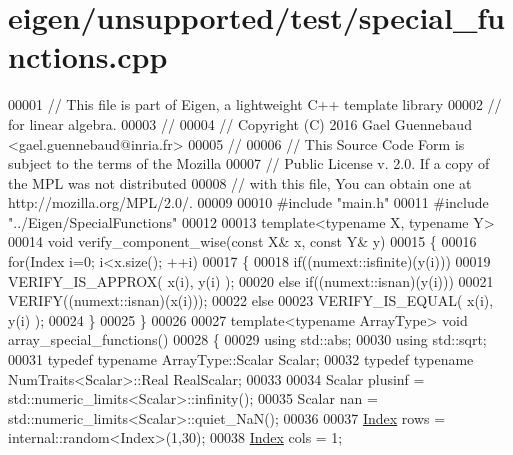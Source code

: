 \hypertarget{eigen_2unsupported_2test_2special__functions_8cpp_source}{}\section{eigen/unsupported/test/special\+\_\+functions.cpp}
\label{eigen_2unsupported_2test_2special__functions_8cpp_source}

\begin{DoxyCode}
00001 \textcolor{comment}{// This file is part of Eigen, a lightweight C++ template library}
00002 \textcolor{comment}{// for linear algebra.}
00003 \textcolor{comment}{//}
00004 \textcolor{comment}{// Copyright (C) 2016 Gael Guennebaud <gael.guennebaud@inria.fr>}
00005 \textcolor{comment}{//}
00006 \textcolor{comment}{// This Source Code Form is subject to the terms of the Mozilla}
00007 \textcolor{comment}{// Public License v. 2.0. If a copy of the MPL was not distributed}
00008 \textcolor{comment}{// with this file, You can obtain one at http://mozilla.org/MPL/2.0/.}
00009 
00010 \textcolor{preprocessor}{#include "main.h"}
00011 \textcolor{preprocessor}{#include "../Eigen/SpecialFunctions"}
00012 
00013 \textcolor{keyword}{template}<\textcolor{keyword}{typename} X, \textcolor{keyword}{typename} Y>
00014 \textcolor{keywordtype}{void} verify\_component\_wise(\textcolor{keyword}{const} X& x, \textcolor{keyword}{const} Y& y)
00015 \{
00016   \textcolor{keywordflow}{for}(Index i=0; i<x.size(); ++i)
00017   \{
00018     \textcolor{keywordflow}{if}((numext::isfinite)(y(i)))
00019       VERIFY\_IS\_APPROX( x(i), y(i) );
00020     \textcolor{keywordflow}{else} \textcolor{keywordflow}{if}((numext::isnan)(y(i)))
00021       VERIFY((numext::isnan)(x(i)));
00022     \textcolor{keywordflow}{else}
00023       VERIFY\_IS\_EQUAL( x(i), y(i) );
00024   \}
00025 \}
00026 
00027 \textcolor{keyword}{template}<\textcolor{keyword}{typename} ArrayType> \textcolor{keywordtype}{void} array\_special\_functions()
00028 \{
00029   \textcolor{keyword}{using} std::abs;
00030   \textcolor{keyword}{using} std::sqrt;
00031   \textcolor{keyword}{typedef} \textcolor{keyword}{typename} ArrayType::Scalar Scalar;
00032   \textcolor{keyword}{typedef} \textcolor{keyword}{typename} NumTraits<Scalar>::Real RealScalar;
00033 
00034   Scalar plusinf = std::numeric\_limits<Scalar>::infinity();
00035   Scalar nan = std::numeric\_limits<Scalar>::quiet\_NaN();
00036 
00037   \hyperlink{namespace_eigen_a62e77e0933482dafde8fe197d9a2cfde}{Index} rows = internal::random<Index>(1,30);
00038   \hyperlink{namespace_eigen_a62e77e0933482dafde8fe197d9a2cfde}{Index} cols = 1;

\end{DoxyCode}
